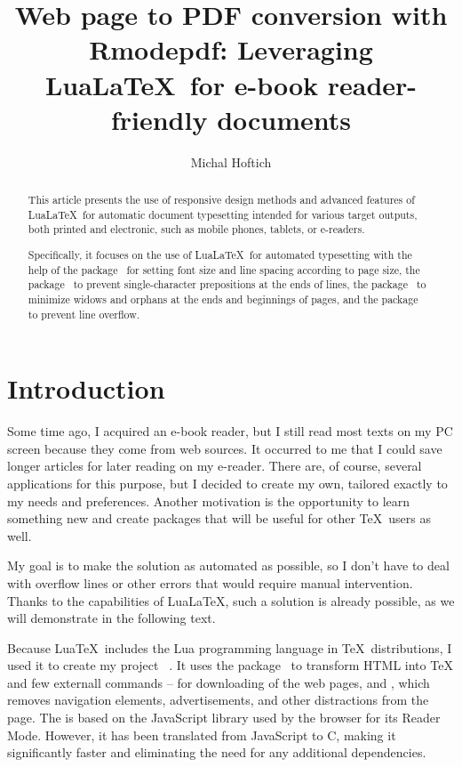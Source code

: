 \documentclass{ltugboat}
\title{Web page to PDF conversion with Rmodepdf: Leveraging Lua\LaTeX\ for e-book reader-friendly documents}
\author{Michal Hoftich}
\newcommand\program[1]{\tbcode{#1}}
\begin{document}
\maketitle

\begin{abstract}
This article presents the use of responsive design methods and advanced features
of Lua\LaTeX\ for automatic document typesetting intended for various target outputs,
both printed and electronic, such as mobile phones, tablets, or e-readers.

Specifically, it focuses on the use of Lua\LaTeX\ for automated
typesetting with the help of the  package~\cite{responsive}
for setting font size and line spacing according to page size, the
 package~\cite{luavlna} to prevent single-character
prepositions at the ends of lines, the 
package~\cite{lua-widow-control} to minimize widows and orphans at the ends and
beginnings of pages, and the  package~\cite{linebreaker} to
prevent line overflow.

\end{abstract}


\section{Introduction}

Some time ago, I acquired an e-book reader, but I still read most texts on my
PC screen because they come from web sources. It occurred to me that I could
save longer articles for later reading on my e-reader. There are, of course,
several applications for this purpose, but I decided to create my own, tailored
exactly to my needs and preferences. Another motivation is the opportunity to
learn something new and create packages that will be useful for other \TeX\
users as well.

My goal is to make the solution as automated as possible, so I don't have to
deal with overflow lines or other errors that would require manual
intervention. Thanks to the capabilities of Lua\LaTeX, such a solution is
already possible, as we will demonstrate in the following text.

Because Lua\TeX\ includes the Lua programming language in \TeX\ distributions,
I used it to create my project \program{Rmodepdf}~\cite{rmodepdf}. It uses the
\tbcode{LuaXML} package~\cite{luaxml} to transform HTML into \TeX{} and few
externall commands -- \program{Curl} for downloading of the web pages, 
and \program{Rdrview} \cite{rdrview}, which removes navigation
elements, advertisements, and other distractions from the page.
The \program{Rdrview} is based on the JavaScript library used by the
\program{Firefox} browser for its Reader Mode. However, it has been translated
from JavaScript to C, making it significantly faster and eliminating the need
for any additional dependencies.
\end{document}
